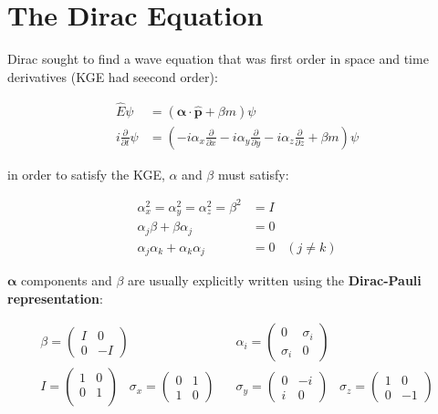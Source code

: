 \documentclass[10pt]{article}
\theoremstyle{definition}
\begin{document}
\section*{The Dirac Equation}%

Dirac sought to find a wave equation that was first order in space and time derivatives (KGE had seecond order):

\begin{align}
    \hat{E}\psi &= (\mathbf{\alpha}\cdot\hat{\mathbf{p}} + \beta m)\psi\\
    i \frac{\partial}{\partial t}\psi &= \left( -i\alpha_x \frac{\partial}{\partial x} -i\alpha_y \frac{\partial}{\partial y} -i\alpha_z \frac{\partial}{\partial z} + \beta m \right)\psi
\end{align}

in order to satisfy the KGE, $\alpha$ and $\beta$ must satisfy:

\begin{align*}
    \alpha_x^2 = \alpha_y^2 = \alpha_z^2 = \beta^2 &= I\\
    \alpha_j\beta + \beta\alpha_j &= 0\\
    \alpha_j \alpha_k + \alpha_k\alpha_j &= 0 \;\;\; (j\neq k)
\end{align*}

$\mathbf{\alpha}$ components and $\beta$ are usually explicitly written using the \textbf{Dirac-Pauli representation}:

\begin{align*}
    \beta = \begin{pmatrix}
        I & 0\\
        0 & -I
    \end{pmatrix}
    \;\;\; &
    \alpha_i = \begin{pmatrix}
        0 & \sigma_i\\
        \sigma_i & 0
    \end{pmatrix}\\
    I = \begin{pmatrix}
        1 & 0 \\
        0 & 1 \\
    \end{pmatrix}
    \;\;\;
    \sigma_x = \begin{pmatrix}
        0 & 1 \\
        1 & 0
    \end{pmatrix}
    \;\;\;&
    \sigma_y = \begin{pmatrix}
        0 & -i\\
        i & 0
    \end{pmatrix}
    \;\;\;
    \sigma_z = \begin{pmatrix}
        1 & 0\\
        0 & -1
    \end{pmatrix}
\end{align*}
\end{document}
